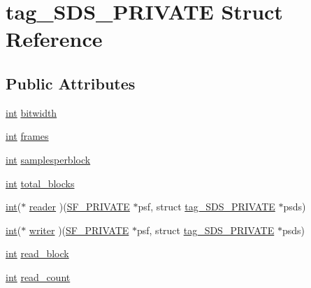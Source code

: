 \hypertarget{structtag___s_d_s___p_r_i_v_a_t_e}{}\section{tag\+\_\+\+S\+D\+S\+\_\+\+P\+R\+I\+V\+A\+TE Struct Reference}
\label{structtag___s_d_s___p_r_i_v_a_t_e}
\subsection*{Public Attributes}
\begin{DoxyCompactItemize}
\item 
\hyperlink{xmltok_8h_a5a0d4a5641ce434f1d23533f2b2e6653}{int} \hyperlink{structtag___s_d_s___p_r_i_v_a_t_e_a1ddc12ff754417f3d5c2076be60d508b}{bitwidth}
\item 
\hyperlink{xmltok_8h_a5a0d4a5641ce434f1d23533f2b2e6653}{int} \hyperlink{structtag___s_d_s___p_r_i_v_a_t_e_a0ced10c82b551c55d173f75f8cf88e91}{frames}
\item 
\hyperlink{xmltok_8h_a5a0d4a5641ce434f1d23533f2b2e6653}{int} \hyperlink{structtag___s_d_s___p_r_i_v_a_t_e_ab9029c15fe84622023349b1fc091e32d}{samplesperblock}
\item 
\hyperlink{xmltok_8h_a5a0d4a5641ce434f1d23533f2b2e6653}{int} \hyperlink{structtag___s_d_s___p_r_i_v_a_t_e_a0b62c326e75375d13359029d6be28173}{total\+\_\+blocks}
\item 
\hyperlink{xmltok_8h_a5a0d4a5641ce434f1d23533f2b2e6653}{int}($\ast$ \hyperlink{structtag___s_d_s___p_r_i_v_a_t_e_a787ef91048491238f71a1644458a50b3}{reader} )(\hyperlink{libsndfile_2src_2common_8h_ab5debd339ecaf40f50a223e218900c24}{S\+F\+\_\+\+P\+R\+I\+V\+A\+TE} $\ast$psf, struct \hyperlink{structtag___s_d_s___p_r_i_v_a_t_e}{tag\+\_\+\+S\+D\+S\+\_\+\+P\+R\+I\+V\+A\+TE} $\ast$psds)
\item 
\hyperlink{xmltok_8h_a5a0d4a5641ce434f1d23533f2b2e6653}{int}($\ast$ \hyperlink{structtag___s_d_s___p_r_i_v_a_t_e_aad18d0b45ff63825e1f13d7f1f7e623c}{writer} )(\hyperlink{libsndfile_2src_2common_8h_ab5debd339ecaf40f50a223e218900c24}{S\+F\+\_\+\+P\+R\+I\+V\+A\+TE} $\ast$psf, struct \hyperlink{structtag___s_d_s___p_r_i_v_a_t_e}{tag\+\_\+\+S\+D\+S\+\_\+\+P\+R\+I\+V\+A\+TE} $\ast$psds)
\item 
\hyperlink{xmltok_8h_a5a0d4a5641ce434f1d23533f2b2e6653}{int} \hyperlink{structtag___s_d_s___p_r_i_v_a_t_e_ade1b2b4b47bea5af50bb31824701df36}{read\+\_\+block}
\item 
\hyperlink{xmltok_8h_a5a0d4a5641ce434f1d23533f2b2e6653}{int} \hyperlink{structtag___s_d_s___p_r_i_v_a_t_e_aa3ebd563a4e5486eae947bceabc6c481}{read\+\_\+count}

\end{DoxyCompactItemize}
